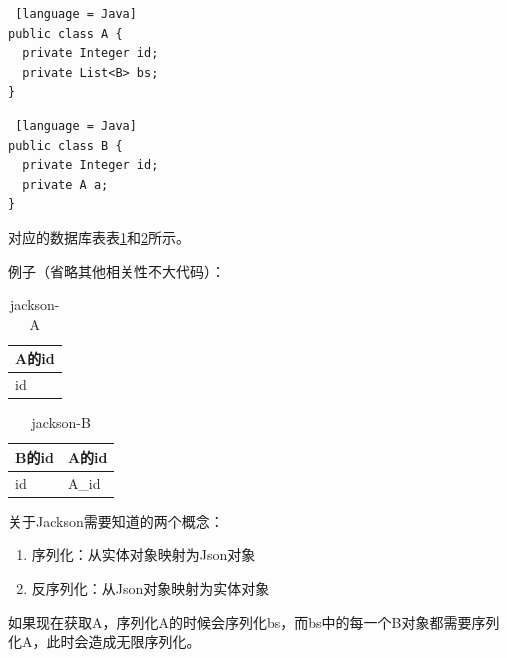 \begin{lstlisting} [language = Java]
public class A {
  private Integer id;
  private List<B> bs;
}
\end{lstlisting}

\begin{lstlisting} [language = Java]
public class B {
  private Integer id;
  private A a;
}
\end{lstlisting}

对应的数据库表表\ref{jackson-A}和\ref{jackson-B}所示。

例子（省略其他相关性不大代码）：

\begin{table}[H]
  \centering
  \song\wuhao
  \caption{jackson-A}
  \label{jackson-A}
  \begin{tabular}{|l|}
    \hline
    A的id \\ \hline
    id    \\ \hline
  \end{tabular}
\end{table}

\begin{table}[H]
  \centering
  \song\wuhao
  \caption{jackson-B}
  \label{jackson-B}
  \begin{tabular}{|l|l|}
    \hline
    B的id & A的id \\ \hline
    id    & A\_id \\ \hline
  \end{tabular}
\end{table}

关于Jackson需要知道的两个概念：
\begin{enumerate}
  \item 序列化：从实体对象映射为Json对象
  \item 反序列化：从Json对象映射为实体对象
\end{enumerate}

如果现在获取A，序列化A的时候会序列化bs，而bs中的每一个B对象都需要序列化A，此时会造成无限序列化。

